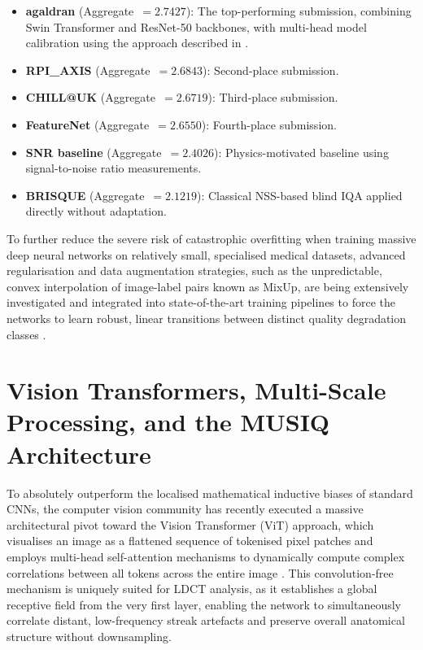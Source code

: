 \begin{itemize}
    \item \textbf{agaldran} (Aggregate~$= 2.7427$): The top-performing submission,
    combining Swin Transformer and ResNet-50 backbones, with multi-head model calibration
    using the approach described in \cite{galdran2022calibration}.

    \item \textbf{RPI\_AXIS} (Aggregate~$= 2.6843$): Second-place submission.

    \item \textbf{CHILL@UK} (Aggregate~$= 2.6719$): Third-place submission.

    \item \textbf{FeatureNet} (Aggregate~$= 2.6550$): Fourth-place submission.

    \item \textbf{SNR baseline} (Aggregate~$= 2.4026$): Physics-motivated baseline
    using signal-to-noise ratio measurements.

    \item \textbf{BRISQUE} (Aggregate~$= 2.1219$): Classical NSS-based blind IQA
    applied directly without adaptation.
\end{itemize}

To further reduce the severe risk of catastrophic overfitting when training massive deep
neural networks on relatively small, specialised medical datasets, advanced regularisation
and data augmentation strategies, such as the unpredictable, convex interpolation of
image-label pairs known as MixUp, are being extensively investigated and integrated into
state-of-the-art training pipelines to force the networks to learn robust, linear
transitions between distinct quality degradation classes \cite{galdran2022calibration}.


\section{Vision Transformers, Multi-Scale Processing, and the MUSIQ Architecture}
\label{sec:lit_vit_musiq}

To absolutely outperform the localised mathematical inductive biases of standard CNNs, the
computer vision community has recently executed a massive architectural pivot toward the
Vision Transformer (ViT) approach, which visualises an image as a flattened sequence of
tokenised pixel patches and employs multi-head self-attention mechanisms to dynamically
compute complex correlations between all tokens across the entire image \cite{sheikh2005nss}.
This convolution-free mechanism is uniquely suited for LDCT analysis, as it establishes a
global receptive field from the very first layer, enabling the network to simultaneously
correlate distant, low-frequency streak artefacts and preserve overall anatomical structure
without downsampling.

